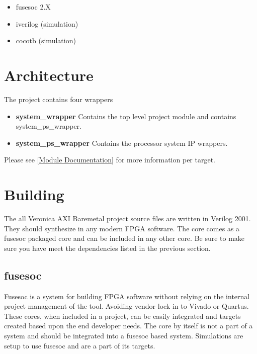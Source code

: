\begin{itemize}
  \item fusesoc 2.X
  \item iverilog (simulation)
  \item cocotb (simulation)
\end{itemize}



\section{Architecture}
\par
The project contains four wrappers

\begin{itemize}
  \item \textbf{system\_wrapper} Contains the top level project module and contains system\_ps\_wrapper.
  \item \textbf{system\_ps\_wrapper} Contains the processor system IP wrappers.
\end{itemize}

\par

Please see \ref{Module Documentation} for more information per target.

\section{Building}

\par
The all Veronica AXI Baremetal project source files are written in Verilog 2001. They should synthesize in any modern FPGA software. The core comes as a fusesoc packaged core and can be
included in any other core. Be sure to make sure you have meet the dependencies listed in the previous section.

\subsection{fusesoc}
\par
Fusesoc is a system for building FPGA software without relying on the internal project management of the tool. Avoiding vendor lock in to Vivado or Quartus.
These cores, when included in a project, can be easily integrated and targets created based upon the end developer needs. The core by itself is not a part of
a system and should be integrated into a fusesoc based system. Simulations are setup to use fusesoc and are a part of its targets.


